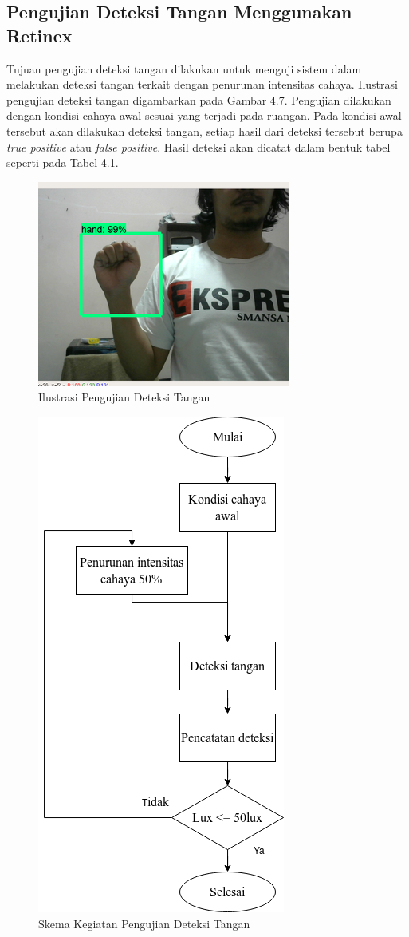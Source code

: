 \subsection{Pengujian Deteksi Tangan Menggunakan Retinex}
Tujuan pengujian deteksi tangan dilakukan untuk menguji sistem dalam melakukan deteksi tangan terkait dengan penurunan intensitas cahaya. Ilustrasi pengujian deteksi tangan digambarkan pada Gambar 4.7. Pengujian dilakukan dengan kondisi cahaya awal sesuai yang terjadi pada ruangan. Pada kondisi awal tersebut akan dilakukan deteksi tangan, setiap hasil dari deteksi tersebut berupa \emph{true positive} atau \emph{false positive}. Hasil deteksi akan dicatat dalam bentuk tabel seperti pada Tabel 4.1.
\begin{figure}[H]
	\centering
	\includegraphics[width=0.72\linewidth]{deteksihand}
	\caption{Ilustrasi Pengujian Deteksi Tangan}
	\label{fig:deteksihand}
\end{figure}
\begin{figure}[H]
	\centering
	\includegraphics[width=0.4\linewidth]{"skema pengujian deteksi tangan"}
	\caption{Skema Kegiatan Pengujian Deteksi Tangan}
	\label{fig:skema-objek-deteksi}
\end{figure}
